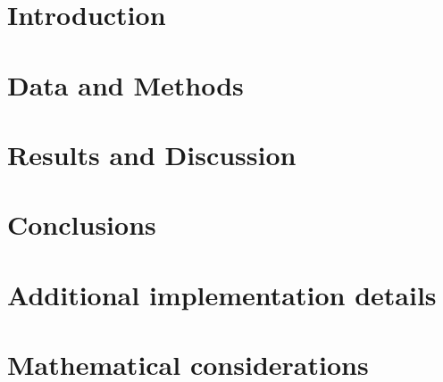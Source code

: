 \documentclass[a4paper,11pt,twoside,openany,british]{book}
\begin{document}
\frontmatter

\tableofcontents

\mainmatter
\chapter{Introduction}
\label{sec:Introduction}

\chapter{Data and Methods}
\label{sec:Data and Methods}


\chapter{Results and Discussion}
\label{sec:Results and Discussion}

\chapter{Conclusions}
\label{sec:Conclusions}


\appendix
\chapter{Additional implementation details}

\chapter{Mathematical considerations}


\backmatter
\printbibliography[heading=bibintoc]
\printnoidxglossary[type=definitions]
\printnoidxglossary[type=\acronymtype,nonumberlist]
\printnoidxglossary[type=symbols,nonumberlist]
\glsaddallunused[symbols]
\end{document}
